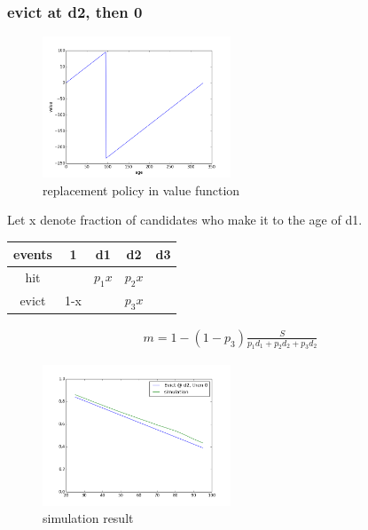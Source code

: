 \documentclass[12pt, letterpaper]{article}
\begin{document}
\subsubsection{evict at d2, then 0}

\begin{figure}[H]
\centering
\includegraphics[width=0.5\textwidth]{evict_d2.png}
\caption{replacement policy in value function}
\end{figure}

Let x denote fraction of candidates who make it to the age of d1.

\begin{center}
\begin{tabular}{c | c c c c}
\hline
events & 1 & d1 & d2 & d3 \\
\hline
hit & & $p_1 x$ & $p_2 x$ &  \\
evict & 1-x & & $p_3 x$ & 
\end{tabular}
\end{center}

\begin{equation}
\begin{aligned}
m = 1 - (1-p_3) \frac{S}{p_1 d_1 + p_2 d_2 + p_3 d_2}
\end{aligned}
\end{equation}

\begin{figure}[H]
\centering
\includegraphics[width=0.5\textwidth]{sim_d2.png}
\caption{simulation result}
\end{figure}
\end{document}
